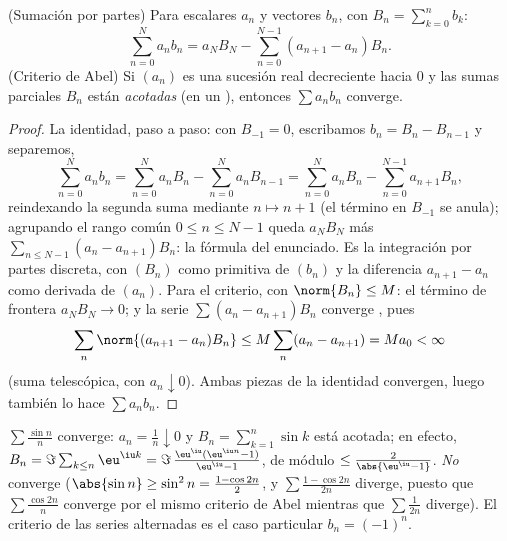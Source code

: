 \begin{theorem}\label{thm:b2:series:abel}
(Sumación por partes) Para escalares $a_n$ y vectores $b_n$, con
$B_n = \sum_{k=0}^{n} b_k$:
\[
\sum_{n=0}^{N} a_n b_n
= a_N B_N - \sum_{n=0}^{N-1} (a_{n+1} - a_n) B_n .
\]
(Criterio de Abel) Si $(a_n)$ es una sucesión real decreciente
hacia $0$ y las sumas parciales $B_n$ están \emph{acotadas} (en un
), entonces $\sum a_n b_n$ converge.
\end{theorem}

\begin{proof}
La identidad, paso a paso: con $B_{-1} = 0$, escribamos $b_n = B_n -
B_{n-1}$ y separemos,
\[
\sum_{n=0}^{N} a_nb_n
= \sum_{n=0}^{N} a_nB_n - \sum_{n=0}^{N} a_nB_{n-1}
= \sum_{n=0}^{N} a_nB_n - \sum_{n=0}^{N-1} a_{n+1}B_{n} ,
\]
reindexando la segunda suma mediante $n \mapsto n + 1$ (el término
en $B_{-1}$ se anula); agrupando el rango común $0 \leq n \leq N-1$
queda $a_NB_N$ más $\sum_{n\leq N-1}(a_n - a_{n+1})B_n$: la fórmula
del enunciado. Es la integración por partes discreta, con $(B_n)$
como primitiva de $(b_n)$ y la diferencia $a_{n+1} - a_n$ como
derivada de $(a_n)$. Para el criterio, con $\norm{B_n} \leq M$: el
término de frontera $a_N B_N \to 0$; y la serie $\sum (a_n -
a_{n+1})B_n$ converge , pues
\[
\sum_n \norm{(a_{n+1} - a_n)B_n} \leq M \sum_n (a_n - a_{n+1})
= M a_0 < \infty
\]
(suma telescópica, con $a_n \downarrow 0$). Ambas piezas de la
identidad convergen, luego también lo hace $\sum a_n b_n$.
\end{proof}

\begin{example}\label{ex:b2:series:sinn}
$\sum \frac{\sin n}{n}$ converge: $a_n = \frac1n \downarrow 0$ y
$B_n = \sum_{k=1}^{n} \sin k$ está acotada; en efecto, $B_n =
\Im\sum_{k \leq n} \eu^{\iu k} = \Im\,\frac{\eu^{\iu}(\eu^{\iu n} -
1)}{\eu^{\iu} - 1}$, de módulo $\leq \frac{2}{\abs{\eu^{\iu} - 1}}$.
\emph{No} converge  ($\abs{\sin n} \geq \sin^2 n =
\frac{1 - \cos 2n}{2}$, y $\sum \frac{1 - \cos 2n}{2n}$ diverge,
puesto que $\sum \frac{\cos 2n}{n}$ converge por el mismo criterio
de Abel mientras que $\sum \frac{1}{2n}$ diverge). El criterio de
las series alternadas es el caso particular $b_n = (-1)^n$.
\end{example}

